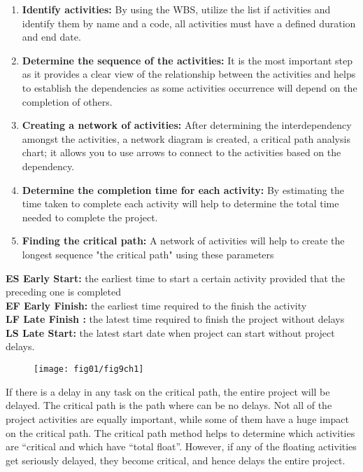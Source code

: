 \begin{enumerate}
	\item \textbf{Identify activities:} By using the WBS, utilize the list if activities and identify them by name and a code, all activities must have a defined duration and end date.
		\item \textbf{Determine the sequence of the activities:} It is the most important step as it provides a clear view of the relationship between the activities and helps to establish the dependencies as some activities occurrence will depend on the completion of others.
			\item \textbf{Creating a network of activities:} After determining the interdependency amongst the activities, a network diagram is created, a critical path analysis chart; it allows you to use arrows to connect to the activities based on the dependency.
			
				\item \textbf{Determine the completion time for each activity:}  By estimating the time taken to complete each activity will help to determine the total time needed to complete the project.
					\item \textbf{Finding the critical path:} A network of activities will help to create the longest sequence "the critical path" using these parameters 
					
\end{enumerate}

\textbf{ES Early Start:} the earliest time to start a certain activity provided that the preceding one is completed \\
\textbf{EF Early Finish:} the earliest time required to the finish the activity  \\
\textbf{LF Late Finish :} the latest time required to finish the project without delays \\
\textbf{LS Late Start:} the latest start date when project can start without project delays. \\


\begin{figure}
	\centering
	\texttt{[image: fig01/fig9ch1]}
\end{figure}


If there is a delay in any task on the critical path, the entire project will be delayed. The critical path is the path where can be no delays. Not all of the project activities are equally important, while some of them have a huge impact on the critical path. The critical path method helps to determine which activities are “critical and which have “total float”. However, if any of the floating activities get seriously delayed, they become critical, and hence delays the entire project.


